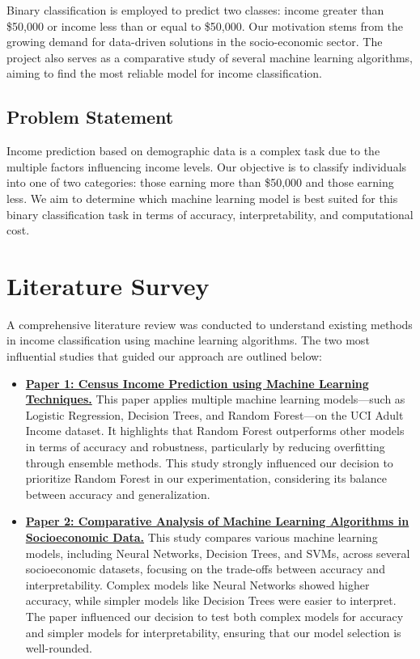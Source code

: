 \documentclass[10pt,twocolumn,letterpaper]{article}
\begin{document}
Binary classification is employed to predict two classes: income greater than \$50,000 or income less than or equal to \$50,000. Our motivation stems from the growing demand for data-driven solutions in the socio-economic sector. The project also serves as a comparative study of several machine learning algorithms, aiming to find the most reliable model for income classification.

\subsection{Problem Statement}
Income prediction based on demographic data is a complex task due to the multiple factors influencing income levels. Our objective is to classify individuals into one of two categories: those earning more than \$50,000 and those earning less. We aim to determine which machine learning model is best suited for this binary classification task in terms of accuracy, interpretability, and computational cost.

\section{Literature Survey}
\label{sec:lit_review}

A comprehensive literature review was conducted to understand existing methods in income classification using machine learning algorithms. The two most influential studies that guided our approach are outlined below:

\begin{itemize}
    \item \textbf{\href{https://ieeexplore.ieee.org/document/10181907}{Paper 1: Census Income Prediction using Machine Learning Techniques.}} This paper applies multiple machine learning models—such as Logistic Regression, Decision Trees, and Random Forest—on the UCI Adult Income dataset. It highlights that Random Forest outperforms other models in terms of accuracy and robustness, particularly by reducing overfitting through ensemble methods. This study strongly influenced our decision to prioritize Random Forest in our experimentation, considering its balance between accuracy and generalization.

    \item \textbf{\href{https://www.sciencedirect.com/science/article/pii/S1877050922021159}{Paper 2: Comparative Analysis of Machine Learning Algorithms in Socioeconomic Data.}} This study compares various machine learning models, including Neural Networks, Decision Trees, and SVMs, across several socioeconomic datasets, focusing on the trade-offs between accuracy and interpretability. Complex models like Neural Networks showed higher accuracy, while simpler models like Decision Trees were easier to interpret. The paper influenced our decision to test both complex models for accuracy and simpler models for interpretability, ensuring that our model selection is well-rounded.
\end{itemize}
\end{document}

